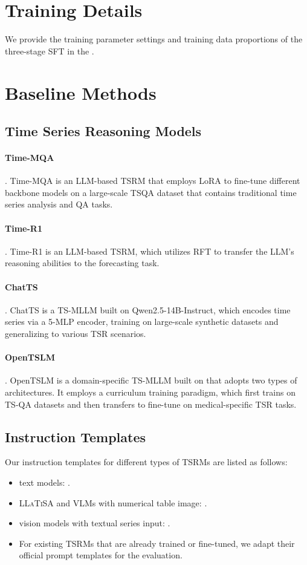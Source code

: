 \documentclass[11pt]{article}
\begin{document}
\section{Training Details}\label{sec:settings}
We provide the training parameter settings and training data proportions of the three-stage SFT in the .

\section{Baseline Methods}\label{sec:baseline}
    
\subsection{Time Series Reasoning Models}
\paragraph{Time-MQA}\cite{timemqa}.
Time-MQA is an LLM-based TSRM that employs LoRA to fine-tune different backbone models on a large-scale TSQA dataset that contains traditional time series analysis and QA tasks.
\paragraph{Time-R1}\cite{timer1}.
Time-R1 is an LLM-based TSRM, which utilizes RFT to transfer the LLM's reasoning abilities to the forecasting task.
\paragraph{ChatTS}\cite{chatts}.
ChatTS is a TS-MLLM built on Qwen2.5-14B-Instruct, which encodes time series via a 5-MLP encoder, training on large-scale synthetic datasets and generalizing to various TSR scenarios.
\paragraph{OpenTSLM}\cite{opentslm}.
OpenTSLM is a domain-specific TS-MLLM built on that adopts two types of architectures. It employs a curriculum training paradigm, which first trains on TS-QA datasets and then transfers to fine-tune on medical-specific TSR tasks.

\subsection{Instruction Templates}
Our instruction templates for different types of TSRMs are listed as follows:
\begin{itemize}[left=0pt]
\setlength{\itemsep}{0.5pt}
    \item text models:  .
    \item \textsc{LLaTiSA} and VLMs with numerical table image: .
    \item vision models with textual series input: .
    \item For existing TSRMs that are already trained or fine-tuned, we adapt their official prompt templates for the evaluation.
\end{itemize}
\end{document}
